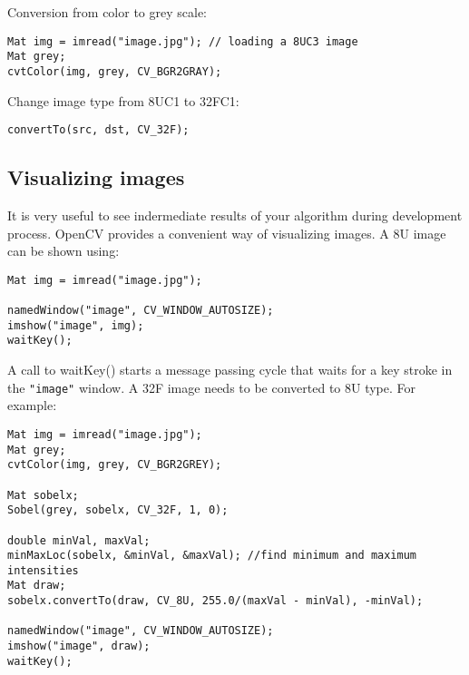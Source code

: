 Conversion from color to grey scale:
\begin{lstlisting}
Mat img = imread("image.jpg"); // loading a 8UC3 image
Mat grey;
cvtColor(img, grey, CV_BGR2GRAY);
\end{lstlisting}
Change image type from 8UC1 to 32FC1:
\begin{lstlisting}
convertTo(src, dst, CV_32F);
\end{lstlisting}

\subsection{Visualizing images}
It is very useful to see indermediate results of your algorithm during development process. OpenCV provides a convenient way of visualizing images. A 8U image can be shown using:
\begin{lstlisting}
Mat img = imread("image.jpg");

namedWindow("image", CV_WINDOW_AUTOSIZE);
imshow("image", img);
waitKey();
\end{lstlisting}
A call to waitKey() starts a message passing cycle that waits for a key stroke in the \texttt{"image"} window. A 32F image needs to be converted to 8U type. For example:
\begin{lstlisting}
Mat img = imread("image.jpg");
Mat grey;
cvtColor(img, grey, CV_BGR2GREY);

Mat sobelx;
Sobel(grey, sobelx, CV_32F, 1, 0);

double minVal, maxVal;
minMaxLoc(sobelx, &minVal, &maxVal); //find minimum and maximum intensities
Mat draw;
sobelx.convertTo(draw, CV_8U, 255.0/(maxVal - minVal), -minVal);

namedWindow("image", CV_WINDOW_AUTOSIZE);
imshow("image", draw);
waitKey();
\end{lstlisting}


\fi